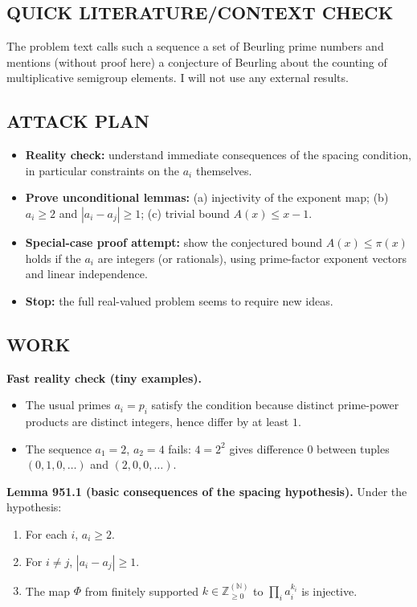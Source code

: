 \subsection*{QUICK LITERATURE/CONTEXT CHECK}
The problem text calls such a sequence a set of Beurling prime numbers and mentions (without proof here) a conjecture of Beurling about the counting of multiplicative semigroup elements.
I will not use any external results.

\subsection*{ATTACK PLAN}
\begin{itemize}
\item \textbf{Reality check:} understand immediate consequences of the spacing condition, in particular constraints on the $a_i$ themselves.
\item \textbf{Prove unconditional lemmas:} (a) injectivity of the exponent map; (b) $a_i\ge 2$ and $|a_i-a_j|\ge1$; (c) trivial bound $A(x)\le x-1$.
\item \textbf{Special-case proof attempt:} show the conjectured bound $A(x)\le \pi(x)$ holds if the $a_i$ are integers (or rationals), using prime-factor exponent vectors and linear independence.
\item \textbf{Stop:} the full real-valued problem seems to require new ideas.
\end{itemize}

\subsection*{WORK}
\noindent\textbf{Fast reality check (tiny examples).}
\begin{itemize}
\item The usual primes $a_i=p_i$ satisfy the condition because distinct prime-power products are distinct integers, hence differ by at least $1$.
\item The sequence $a_1=2$, $a_2=4$ fails: $4=2^2$ gives difference $0$ between tuples $(0,1,0,\dots)$ and $(2,0,0,\dots)$.
\end{itemize}

\medskip
\noindent\textbf{Lemma 951.1 (basic consequences of the spacing hypothesis).}
Under the hypothesis:
\begin{enumerate}
\item For each $i$, $a_i\ge 2$.
\item For $i\ne j$, $|a_i-a_j|\ge 1$.
\item The map $\Phi$ from finitely supported $k\in\mathbb Z_{\ge0}^{(\mathbb N)}$ to $\prod_i a_i^{k_i}$ is injective.
\end{enumerate}

